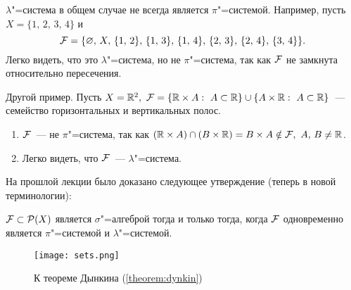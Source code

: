 \begin{exercise}
    $\lambda$"=система в общем случае не всегда является $\pi$"=системой. Например, пусть 
    $X=\{1,\,2,\,3,\,4\}$ и 
    \[
        \mathcal{F}  = \{\varnothing,\, X,\, \{1,\,2\},\, \{1,\,3\},\,\{1,\,4\},\,\{2,\,3\},\,\{2,\,4\},\,\{3,\,4\}\}.    
    \]
    Легко видеть, что это $\lambda$"=система, но не $\pi$"=система, так как $\mathcal{F} $ не замкнута относительно пересечения.
\end{exercise}

\begin{exercise}
    Другой пример. Пусть $X=\mathbb{R}^2,\ \mathcal{F}  = \{\mathbb{R}\times A:\ A\subset \mathbb{R}\}\cup \{A\times \mathbb{R}:\ A\subset \mathbb{R}\}$~---
    семейство горизонтальных и вертикальных полос.
    \begin{enumerate}
        \item $\mathcal{F} $~--- не $\pi$"=система, так как $(\mathbb{R}\times A)\cap (B\times \mathbb{R})=B\times A\notin \mathcal{F} ,\ A,\, B\neq \mathbb{R}$.
        \item Легко видеть, что $\mathcal{F} $~--- $\lambda$"=система.
    \end{enumerate}
\end{exercise}

На прошлой лекции было доказано следующее утверждение (теперь в новой терминологии):
\begin{claim}
    $\mathcal{F} \subset\mathcal{P}(X)$ является $\sigma$"=алгеброй тогда и только тогда, когда $\mathcal{F} $ 
    одновременно является $\pi$"=системой и $\lambda$"=системой.
\end{claim}

\begin{figure}[!ht]
    \centering
    \texttt{[image: sets.png]}
    \caption{К теореме Дынкина (\ref{theorem:dynkin})}
    \label{fig:sets}
\end{figure}

